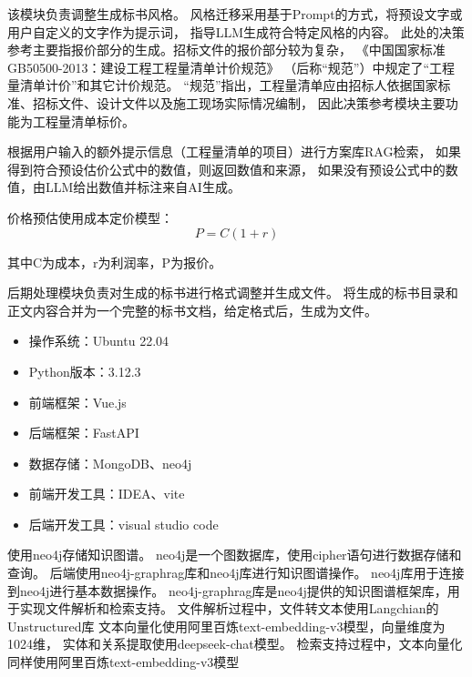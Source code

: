 \documentclass{xmu}
\begin{document}
该模块负责调整生成标书风格。
风格迁移采用基于Prompt的方式，将预设文字或用户自定义的文字作为提示词，
指导LLM生成符合特定风格的内容。
此处的决策参考主要指报价部分的生成。招标文件的报价部分较为复杂，
《中国国家标准GB50500-2013：建设工程工程量清单计价规范》
（后称“规范”）中规定了“工程量清单计价”和其它计价规范。
“规范”指出，工程量清单应由招标人依据国家标准、招标文件、设计文件以及施工现场实际情况编制，
因此决策参考模块主要功能为工程量清单标价。

根据用户输入的额外提示信息（工程量清单的项目）进行方案库RAG检索，
如果得到符合预设估价公式中的数值，则返回数值和来源，
如果没有预设公式中的数值，由LLM给出数值并标注来自AI生成。

价格预估使用成本定价模型：
\begin{equation}
    P = C (1+r)
\end{equation}

其中C为成本，r为利润率，P为报价。

后期处理模块负责对生成的标书进行格式调整并生成文件。
将生成的标书目录和正文内容合并为一个完整的标书文档，给定格式后，生成为文件。
    \begin{itemize}
        \item 操作系统：Ubuntu 22.04
        \item Python版本：3.12.3
    \end{itemize}
    \begin{itemize}
        \item 前端框架：Vue.js
        \item 后端框架：FastAPI
        \item 数据存储：MongoDB、neo4j
    \end{itemize}
    \begin{itemize}
        \item 前端开发工具：IDEA、vite
        \item 后端开发工具：visual studio code
    \end{itemize}
    使用neo4j存储知识图谱。
    neo4j是一个图数据库，使用cipher语句进行数据存储和查询。
    后端使用neo4j-graphrag库和neo4j库进行知识图谱操作。
    neo4j库用于连接到neo4j进行基本数据操作。
    neo4j-graphrag库是neo4j提供的知识图谱框架库，用于实现文件解析和检索支持。
    文件解析过程中，文件转文本使用Langchian的Unstructured库
    文本向量化使用阿里百炼text-embedding-v3模型，向量维度为1024维，
    实体和关系提取使用deepseek-chat模型。
    检索支持过程中，文本向量化同样使用阿里百炼text-embedding-v3模型
    
\end{document}
